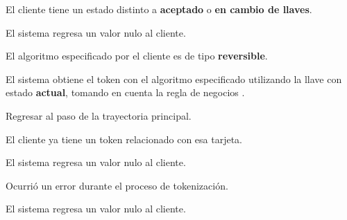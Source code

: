 {\begin{trayectoriaPrincipal}
  \end{trayectoriaPrincipal}

  \begin{trayectoriaAlternativa}
    {El cliente tiene un estado distinto a \textbf{aceptado} o
      \textbf{en cambio de llaves}.}

    \item El sistema regresa un valor nulo al cliente.

  \end{trayectoriaAlternativa}

  \begin{trayectoriaAlternativa}
    {El algoritmo especificado por el cliente es de tipo \textbf{reversible}.}

    \item El sistema obtiene el token con el algoritmo especificado utilizando
      la llave con estado \textbf{actual}, tomando en cuenta la regla de
      negocios .

    \item Regresar al paso  de la trayectoria
      principal.

  \end{trayectoriaAlternativa}

  \begin{trayectoriaAlternativa}
    {El cliente ya tiene un token relacionado con esa tarjeta.}

    \item El sistema regresa un valor nulo al cliente.

  \end{trayectoriaAlternativa}

  \begin{trayectoriaAlternativa}
    {Ocurrió un error durante el proceso de tokenización.}

    \item El sistema regresa un valor nulo al cliente.

  \end{trayectoriaAlternativa}

}

